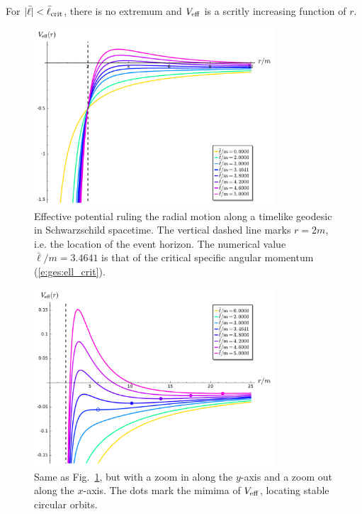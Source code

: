 For $|\bar{\ell}| < \bar{\ell}_{\rm crit}$, there is no extremum and
$V_{\rm eff}$ is a scritly increasing function of $r$.

\begin{figure}
\centerline{\includegraphics[width=0.8\textwidth]{ges_eff_pot.pdf}}
\caption[]{\label{f:ges:eff_pot} \footnotesize
Effective potential ruling the radial motion along a timelike geodesic in
Schwarzschild spacetime. The vertical dashed line marks $r=2m$, i.e. the
location of the event horizon.
The numerical value $\bar{\ell}/m=3.4641$ is that of the critical
specific angular momentum (\ref{e:ges:ell_crit}).}
\end{figure}

\begin{figure}
\centerline{\includegraphics[width=0.8\textwidth]{ges_eff_pot_zoom.pdf}}
\caption[]{\label{f:ges:eff_pot_zoom} \footnotesize
Same as Fig.~\ref{f:ges:eff_pot}, but with a zoom in along the $y$-axis
and a zoom out along the $x$-axis. The dots mark the mimima of
$V_{\rm eff}$, locating stable circular orbits.}
\end{figure}

